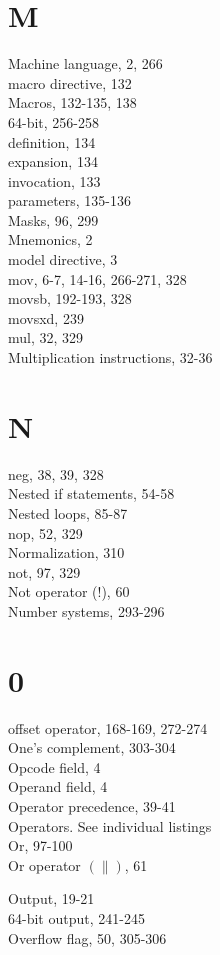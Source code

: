 \documentclass[10pt]{article}
\begin{document}
\section*{M}
Machine language, 2, 266\\
macro directive, 132\\
Macros, 132-135, 138\\
64-bit, 256-258\\
definition, 134\\
expansion, 134\\
invocation, 133\\
parameters, 135-136\\
Masks, 96, 299\\
Mnemonics, 2\\
model directive, 3\\
mov, 6-7, 14-16, 266-271, 328\\
movsb, 192-193, 328\\
movsxd, 239\\
mul, 32, 329\\
Multiplication instructions, 32-36

\section*{N}
neg, 38, 39, 328\\
Nested if statements, 54-58\\
Nested loops, 85-87\\
nop, 52, 329\\
Normalization, 310\\
not, 97, 329\\
Not operator (!), 60\\
Number systems, 293-296

\section*{0}
offset operator, 168-169, 272-274\\
One's complement, 303-304\\
Opcode field, 4\\
Operand field, 4\\
Operator precedence, 39-41\\
Operators. See individual listings\\
Or, 97-100\\
Or operator $(\|)$, 61

Output, 19-21\\
64-bit output, 241-245\\
Overflow flag, 50, 305-306
\end{document}
